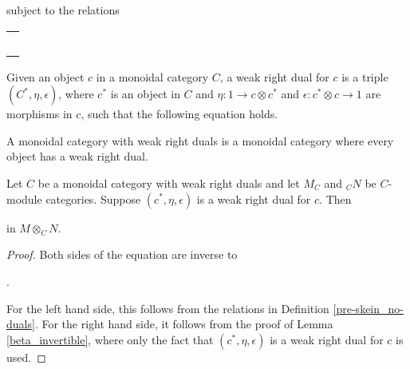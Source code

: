 subject to the relations

\begin{center}
\begin{tabular}{l}
 \\ \\

 \\ \\ 

 \\ \\


\end{tabular}
\end{center}

\begin{definition}
 
Given an object $c$ in a monoidal category $C$, a weak right dual for $c$ is a triple $(C^*,\eta,\epsilon)$, where $c^*$ is an object in $C$ and $\eta:1\to c\otimes c^*$ and $\epsilon:c^*\otimes c\to 1$ are morphisms in $c$, such that the following equation holds.

\begin{center}
 
\end{center}

A monoidal category with weak right duals is a monoidal category where every object has a weak right dual.\end{definition}

\begin{lemma}\label{up_skein}
  
Let $C$ be a monoidal category with weak right duals and let $M_C$ and $_{C}N$ be $C$-module categories. Suppose $(c^*,\eta,\epsilon)$ is a weak right dual for $c$. Then \begin{center}\end{center} in $M\otimes_C N$.
\end{lemma}

\begin{proof} Both sides of the equation are inverse to \begin{center}.\end{center} For the left hand side, this follows from the relations in Definition \ref{pre-skein_no-duals}. For the right hand side, it follows from the proof of Lemma \ref{beta_invertible}, where only the fact that $(c^*,\eta,\epsilon)$ is a weak right dual for $c$ is used.\end{proof}

